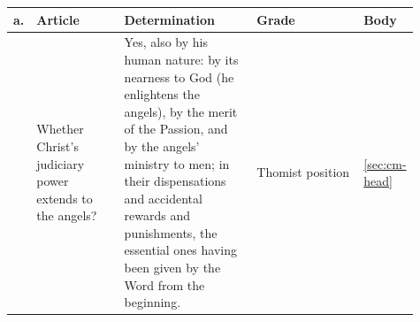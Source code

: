 \begingroup\footnotesize
\begin{longtable}{>{\raggedright\arraybackslash}p{0.03\linewidth}>{\raggedright\arraybackslash}p{0.22\linewidth}>{\raggedright\arraybackslash}p{0.33\linewidth}>{\raggedright\arraybackslash}p{0.27\linewidth}>{\raggedright\arraybackslash}p{0.06\linewidth}}
\toprule
\textbf{a.} & \textbf{Article} & \textbf{Determination} & \textbf{Grade} & \textbf{Body}\\
\midrule
\endhead
6 & Whether Christ's judiciary power extends to the angels? & Yes, also by his human nature: by its nearness to God (he enlightens the angels), by the merit of the Passion, and by the angels' ministry to men; in their dispensations and accidental rewards and punishments, the essential ones having been given by the Word from the beginning. & Thomist position & \ref{sec:cm-head}\\
\bottomrule
\end{longtable}
\endgroup
